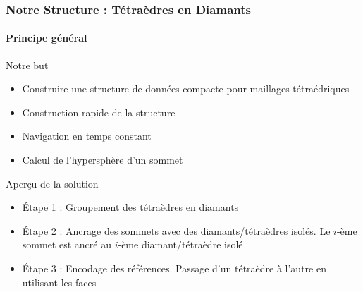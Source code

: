 \documentclass[9pt]{beamer}
\begin{document}
\begin{frame}
\small
\frametitle{Notre Structure : Tétraèdres en Diamants}
\framesubtitle{Principe général}
\small
\begin{block}{Notre but}
\begin{itemize}
\item Construire une structure de données compacte pour maillages tétraédriques
\item Construction rapide de la structure
\item Navigation en temps constant
\item Calcul de l'hypersphère d'un sommet
\end{itemize}
\end{block}
\begin{block}{Aper\c cu de la solution}
\begin{itemize}
\item \'{E}tape 1 : Groupement des tétraèdres en diamants %
\item \'{E}tape 2 : Ancrage des sommets avec des diamants/tétraèdres isolés. Le $i$-ème sommet est ancré au $i$-ème diamant/tétraèdre isolé %
\item \'{E}tape 3 : Encodage des références. Passage d'un tétraèdre à l'autre en utilisant les faces %
\end{itemize}
\end{block}
\end{frame}
\end{document}
